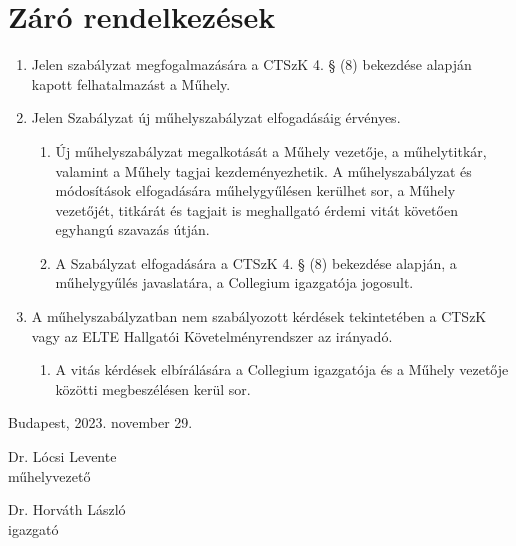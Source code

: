 \documentclass{../styles/rulebook}
\begin{document}
\section{Záró rendelkezések}

\begin{enumerate}
	\item Jelen szabályzat megfogalmazására a CTSzK 4. § (8) bekezdése alapján kapott felhatalmazást a Műhely.
	\item Jelen Szabályzat új műhelyszabályzat elfogadásáig érvényes.
	\begin{enumerate}
		\item Új műhelyszabályzat megalkotását a Műhely vezetője, a műhelytitkár, valamint a Műhely tagjai kezdeményezhetik. A műhelyszabályzat és módosítások elfogadására műhelygyűlésen kerülhet sor, a Műhely vezetőjét, titkárát és tagjait is meghallgató érdemi vitát követően egyhangú szavazás útján.
		\item A Szabályzat elfogadására a CTSzK 4. § (8) bekezdése alapján, a műhelygyűlés javaslatára, a Collegium igazgatója jogosult.
	\end{enumerate}
	\item A műhelyszabályzatban nem szabályozott kérdések tekintetében a CTSzK vagy az ELTE Hallgatói Követelményrendszer az irányadó.
	\begin{enumerate}
		\item A vitás kérdések elbírálására a Collegium igazgatója és a Műhely vezetője közötti megbeszélésen kerül sor.
	\end{enumerate}
\end{enumerate}

\vspace{0.3in}
Budapest, 2023. november 29.
\vspace{0.6in}

\begin{minipage}{3in}
\begin{center}
Dr. Lócsi Levente\\
műhelyvezető
\end{center}
\end{minipage}
\begin{minipage}{3in}
\begin{center}
Dr. Horváth László\\
igazgató
\end{center}
\end{minipage}
\end{document}
